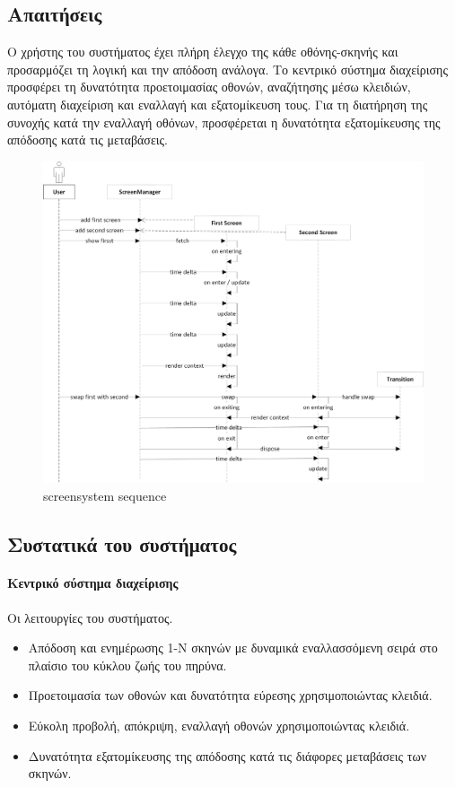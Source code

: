	\subsection{Απαιτήσεις}
	Ο χρήστης του συστήματος έχει πλήρη έλεγχο της κάθε οθόνης-σκηνής και προσαρμόζει τη λογική και την απόδοση ανάλογα. Το κεντρικό σύστημα διαχείρισης προσφέρει τη δυνατότητα προετοιμασίας οθονών, αναζήτησης μέσω κλειδιών, αυτόματη διαχείριση και εναλλαγή και εξατομίκευση τους. Για τη διατήρηση της συνοχής κατά την εναλλαγή οθόνων, προσφέρεται η δυνατότητα εξατομίκευσης της απόδοσης κατά τις μεταβάσεις.

	\begin{figure}[h!]
		\centering
		\includegraphics[width=165mm]{Images/screensystem_sequence}
		\caption{screensystem sequence}
		\label{fig:screensystem_sequence}
	\end{figure}	
	
	\subsection{Συστατικά του συστήματος}		
	\paragraph{Κεντρικό σύστημα διαχείρισης}
	Οι λειτουργίες του συστήματος.
	\begin{itemize}
	\item Απόδοση και ενημέρωσης 1-N σκηνών με δυναμικά εναλλασσόμενη σειρά στο πλαίσιο του κύκλου ζωής του πηρύνα.
	\item Προετοιμασία των οθονών και δυνατότητα εύρεσης χρησιμοποιώντας κλειδιά.
	\item Εύκολη προβολή, απόκριψη, εναλλαγή οθονών χρησιμοποιώντας κλειδιά.
	\item Δυνατότητα εξατομίκευσης της απόδοσης κατά τις διάφορες μεταβάσεις των σκηνών.
	\end{itemize}

